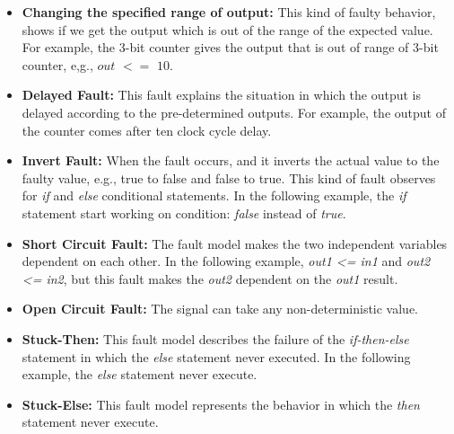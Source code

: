 \begin{itemize}
\begin{table}[tb!]
{\begin{tabular}{|c|c|c|c|}
 \hline
 
 
\end{tabular}
}
\end{table}

\item \textbf{Changing the specified range of output:} This kind of faulty behavior, shows if we get the output which is out of the range of the expected value. For example, the 3-bit counter gives the output that is out of range of 3-bit counter, e,g., $out$ $<=$ $10$.

\item \textbf{Delayed Fault:} This fault explains the situation in which the output is delayed according to the pre-determined outputs. For example, the output of the counter comes after ten clock cycle delay.



\item \textbf{Invert Fault:} When the fault occurs, and it inverts the actual value to the faulty value, e.g., true to false and false to true. This kind of fault observes for \textit{if} and \textit{else}
conditional statements. In the following example, the \textit{if} statement start working on condition: \textit{false} instead of \textit{true}.




\item \textbf{Short Circuit Fault:} The fault model makes the two independent variables dependent on each other. In the following example, \textit{out1 <= in1} and \textit{out2 <= in2}, but this fault makes the \textit{out2} dependent on the \textit{out1} result.






\item \textbf{Open Circuit Fault:} The signal can take any non-deterministic value.





\item \textbf{Stuck-Then:} This fault model describes the failure of the \textit{if-then-else} statement in which the \textit{else}
 statement never executed. In the following example, the \textit{else }
statement never execute.






\item \textbf{Stuck-Else:} This fault model represents the behavior in which the \textit{then} statement never execute.








\end{itemize}
